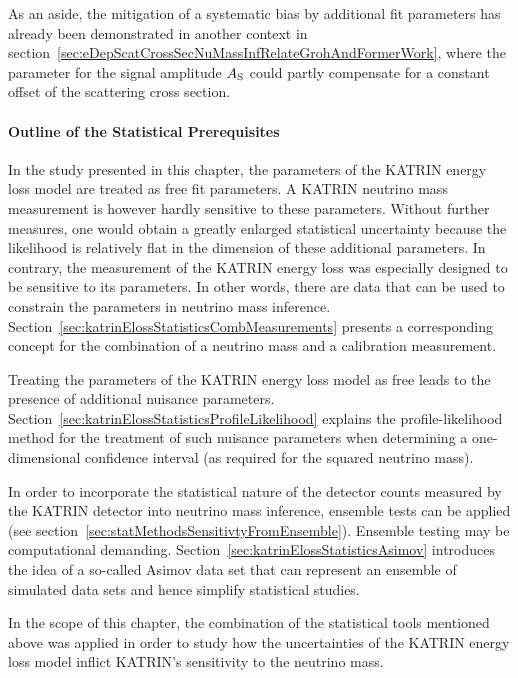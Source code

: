 As an aside, the mitigation of a systematic bias by additional fit parameters has already been demonstrated in another context in section~\ref{sec:eDepScatCrossSecNuMassInfRelateGrohAndFormerWork}, where the parameter for the signal amplitude $A_{\mathrm{S}}$ could partly compensate for a constant offset of the scattering cross section.

\paragraph{Outline of the Statistical Prerequisites}
In the study presented in this chapter, the parameters of the KATRIN energy loss model are treated as free fit parameters. A KATRIN neutrino mass measurement is however hardly sensitive to these parameters. Without further measures, one would obtain a greatly enlarged statistical uncertainty because the likelihood is relatively flat in the dimension of these additional parameters. In contrary, the measurement of the KATRIN energy loss was especially designed to be sensitive to its parameters. In other words, there are data that can be used to constrain the parameters in neutrino mass inference. Section~\ref{sec:katrinElossStatisticsCombMeasurements} presents a corresponding concept for the combination of a neutrino mass and a calibration measurement.

Treating the parameters of the KATRIN energy loss model as free leads to the presence of additional nuisance parameters. Section~\ref{sec:katrinElossStatisticsProfileLikelihood} explains the profile-likelihood method for the treatment of such nuisance parameters when determining a one-dimensional confidence interval (as required for the squared neutrino mass). 

In order to incorporate the statistical nature of the detector counts measured by the KATRIN detector into neutrino mass inference, ensemble tests can be applied (see section~\ref{sec:statMethodsSensitivtyFromEnsemble}). Ensemble testing may be computational demanding. Section~\ref{sec:katrinElossStatisticsAsimov} introduces the idea of a so-called Asimov data set that can represent an ensemble of simulated data sets and hence simplify statistical studies.

In the scope of this chapter, the combination of the statistical tools mentioned above was applied in order to study how the uncertainties of the KATRIN energy loss model inflict KATRIN's sensitivity to the neutrino mass.

